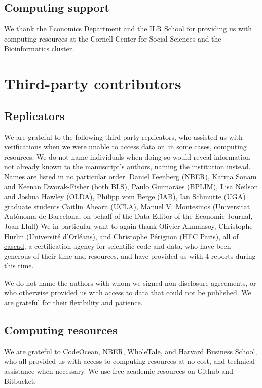 \documentclass[PP]{AEA}
\begin{document}
\subsection{Computing support}

We thank the Economics Department and the ILR School for providing us with computing resources at the Cornell Center for Social Sciences and the Bioinformatics cluster. 

\section{Third-party contributors}

\subsection{Replicators}
\label{app:3rdparty}

We are grateful to the following third-party replicators, who assisted us with verifications when we were unable to access data or, in some cases, computing resources. We do not name individuals when doing so would reveal information not already known to the manuscript's authors, naming the institution instead. Names are listed in no particular order.
%
Daniel Feenberg (\ac{NBER}), Karma Sonam and Keenan Dworak-Fisher (both \ac{BLS}), Paulo Guimarães (\ac{BPLIM}), Lisa Neilson and Joshua Hawley (\ac{OLDA}), Philipp vom Berge (IAB), Ian Schmutte (UGA) graduate students Caitlin Ahearn (UCLA), Manuel V. Montesinos (Universitat Autònoma de Barcelona, on behalf of the Data Editor of the Economic Journal, Joan Llull)   We in particular want to again thank Olivier Akmansoy, Christophe Hurlin (Université d'Orléans), and Christophe Pérignon (HEC Paris), all of \href{https://cascad.tech}{cascad}, a certification agency for scientific code and data, who have been generous of their time and resources, and have provided us with 4 reports during this time.  

We do not name the authors with whom we signed non-disclosure agreements, or who otherwise provided us with access to data that could not be published. We are grateful for their flexibility and patience.

\subsection{Computing resources}
\label{app:3rdparty-computing}

We are grateful to CodeOcean, NBER, WholeTale, and Harvard Business School, who all provided us with access to computing resources at no cost, and technical assistance when necessary. We use free academic resources on Github and Bitbucket. 
\end{document}
